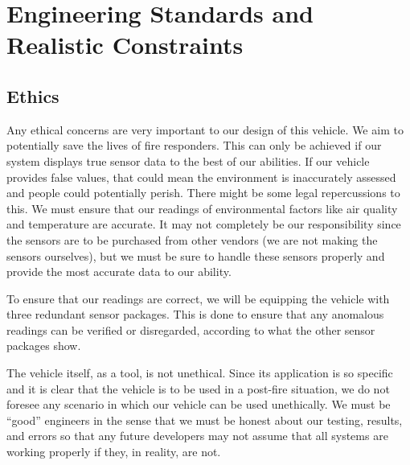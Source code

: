 \chapter{Engineering Standards and Realistic Constraints}
\section{Ethics} Any ethical concerns are very important to our design of this vehicle. We aim to potentially save the lives of fire responders. This can only be achieved if our system displays true sensor data to the best of our abilities. If our vehicle provides false values, that could mean the environment is inaccurately assessed and people could potentially perish. There might be some legal repercussions to this. We must ensure that our readings of environmental factors like air quality and temperature are accurate. It may not completely be our responsibility since the sensors are to be purchased from other vendors (we are not making the sensors ourselves), but we must be sure to handle these sensors properly and provide the most accurate data to our ability. 

To ensure that our readings are correct, we will be equipping the vehicle with three redundant sensor packages. This is done to ensure that any anomalous readings can be verified or disregarded, according to what the other sensor packages show.

	The vehicle itself, as a tool, is not unethical. Since its application is so specific and it is clear that the vehicle is to be used in a post-fire situation, we do not foresee any scenario in which our vehicle can be used unethically. We must be “good” engineers in the sense that we must be honest about our testing, results, and errors so that any future developers may not assume that all systems are working properly if they, in reality, are not. 

